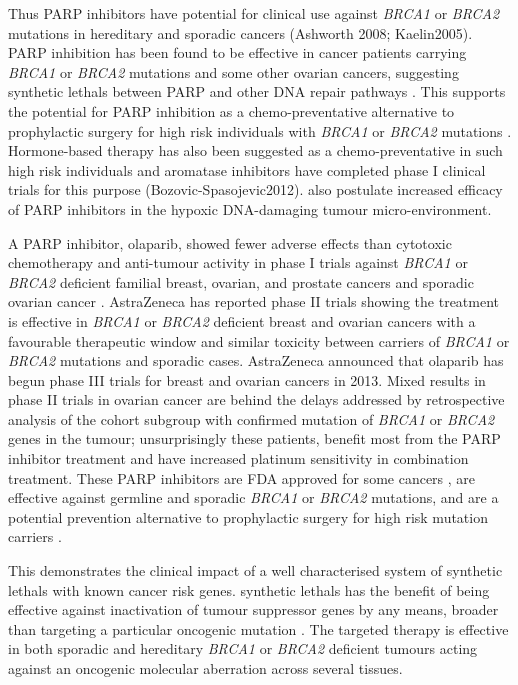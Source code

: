 Thus PARP inhibitors have potential for clinical use against \textit{BRCA1} or \textit{BRCA2} mutations in hereditary and sporadic cancers (Ashworth 2008; Kaelin2005). PARP inhibition has been found to be effective in cancer patients carrying \textit{BRCA1} or \textit{BRCA2} mutations and some other ovarian cancers, suggesting \glspl{synthetic lethal} between PARP and other DNA repair pathways \citep{Strom2012}. This supports the potential for PARP inhibition as a chemo-preventative alternative to prophylactic surgery for high risk individuals with \textit{BRCA1} or \textit{BRCA2} mutations \citep{Strom2012}. Hormone-based therapy has also been suggested as a chemo-preventative in such high risk individuals and aromatase inhibitors have completed phase I clinical trials for this purpose (Bozovic-Spasojevic2012). \citet{Strom2012} also postulate increased efficacy of PARP inhibitors in the hypoxic DNA-damaging tumour micro-environment.  

A PARP inhibitor, olaparib, showed fewer adverse effects than cytotoxic chemotherapy and anti-tumour activity in phase I trials against \textit{BRCA1} or \textit{BRCA2} deficient familial breast, ovarian, and prostate cancers \citep{Fong2009} and sporadic ovarian cancer \citep{Fong2010}. AstraZeneca has reported phase II trials showing the treatment is effective in \textit{BRCA1} or \textit{BRCA2} deficient breast \citep{Tutt2010} and ovarian cancers \citep{Audeh2010} with a favourable therapeutic window and similar toxicity between carriers of \textit{BRCA1} or \textit{BRCA2} mutations and sporadic cases. AstraZeneca announced that olaparib has begun phase III trials for breast and ovarian cancers in 2013. Mixed results in phase II trials in ovarian cancer are behind the delays addressed by retrospective analysis of the cohort subgroup with confirmed mutation of \textit{BRCA1} or \textit{BRCA2} genes in the tumour; unsurprisingly these patients, benefit most from the PARP inhibitor treatment and have increased platinum sensitivity in combination treatment. These PARP inhibitors are FDA approved for some cancers \cite{McLachlan2016}, are effective against germline and sporadic \textit{BRCA1} or \textit{BRCA2} mutations, and are a potential prevention alternative to prophylactic surgery for high risk mutation carriers \cite{Strom2012}.

This demonstrates the clinical impact of a well characterised system of \glspl{synthetic lethal} with known cancer risk genes. \Glspl{synthetic lethal} has the benefit of being effective against inactivation of tumour suppressor genes by any means, broader than targeting a particular oncogenic mutation \citep{Kaelin2005}. The targeted therapy is effective in both sporadic and hereditary \textit{BRCA1} or \textit{BRCA2} deficient tumours acting against an oncogenic molecular aberration across several tissues.  

